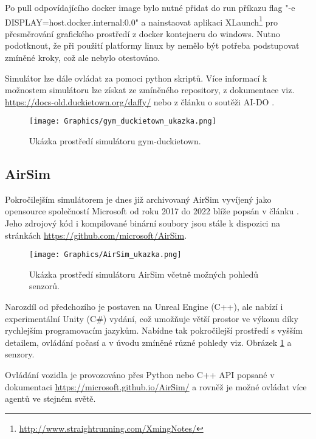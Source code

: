 \documentclass[czech, bc, kky, he, iso690numb]{fasthesis}
\begin{document}
    			Po pull odpovídajícího docker image bylo nutné přidat do run příkazu flag 
    			\command"-e DISPLAY=host.docker.internal:0.0" a nainstaovat aplikaci XLaunch\footnote{\href{http://www.straightrunning.com/XmingNotes/}{http://www.straightrunning.com/XmingNotes/}} pro přesměrování grafického prostředí z docker kontejneru do windows. Nutno podotknout, že při použití platformy linux by nemělo být potřeba podstupovat zmíněné kroky, což ale nebylo otestováno.
    			
    			Simulátor lze dále ovládat za pomoci python skriptů. Více informací k možnostem simulátoru lze získat ze zmíněného repository, z dokumentace viz. \href{https://docs-old.duckietown.org/daffy/}{https://docs-old.duckietown.org/daffy/} nebo z článku o soutěži AI-DO \cite{AI-DO}.
	    			\begin{figure}[h]
	    				\centering
	    				\texttt{[image: Graphics/gym\_duckietown\_ukazka.png]}
	    				\caption{Ukázka prostředí simulátoru gym-duckietown.}
	    			\end{figure}
    			
    		\subsection{AirSim}
    			Pokročilejším simulátorem je dnes již archivovaný AirSim vyvíjený jako opensource společností Microsoft od roku 2017 do 2022 blíže popsán v článku \cite{airsim_paper}. Jeho zdrojový kód i kompilované binární soubory jsou stále k dispozici na stránkách \href{https://github.com/microsoft/AirSim}{https://github.com/microsoft/AirSim}.
    			
    				\begin{figure}[h]
	    				\centering
	    				\texttt{[image: Graphics/AirSim\_ukazka.png]}
	    				\caption{Ukázka prostředí simulátoru AirSim včetně možných pohledů senzorů.}
	    				\label{pic:AirSim_ukazka}
	    			\end{figure}
    			
    			Narozdíl od předchozího je postaven na Unreal Engine (C++), ale nabízí i experimentální Unity (C\#) vydání, což umožňuje větší prostor ve výkonu díky rychlejším programovacím jazykům. Nabídne tak pokročilejší prostředí s vyšším detailem, ovládání počasí a v úvodu zmíněné různé pohledy viz. Obrázek \ref{pic:AirSim_ukazka} a senzory.
    			
    			Ovládání vozidla je provozováno přes Python nebo C++ API popsané v dokumentaci \href{https://microsoft.github.io/AirSim/}{https://microsoft.github.io/AirSim/} a rovněž je možné ovládat více agentů ve stejném světě.
	    		
\end{document}
